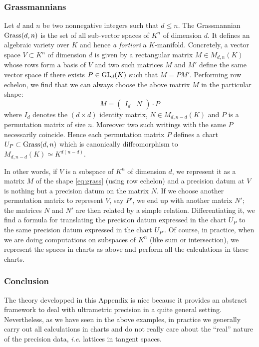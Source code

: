 \documentclass{lms}
\begin{document}
\subsubsection*{Grassmannians}

Let $d$ and $n$ be two nonnegative integers such that $d \leq n$. The 
Grassmannian $\text{\rm Grass}(d,n)$ is the set of all sub-vector spaces of $K^n$ 
of dimension $d$. It defines an algebraic variety over $K$ and hence
\emph{a fortiori} a $K$-manifold.
Concretely, a vector space $V \subset K^n$ of dimension $d$ is given by 
a rectangular matrix $M \in M_{d,n}(K)$ whose rows form a basis of $V$ 
and two such matrices $M$ and $M'$ define the same vector space if there 
exists $P \in \text{\rm GL}_d(K)$ such that $M = P M'$. Performing row echelon, we 
find that we can always choose the above matrix $M$ in the particular
shape:
\begin{equation}
\label{eq:grass}
M = \begin{pmatrix} I_d & N \end{pmatrix} \cdot P
\end{equation}
where $I_d$ denotes the $(d \times d)$ identity matrix, $N \in M_{d, 
n-d}(K)$ and $P$ is a permutation matrix of size $n$. Moreover two 
such writings with the same $P$ necessarily coincide. Hence each 
permutation matrix $P$ defines a chart $U_P \subset \text{\rm Grass}(d,n)$ which
is canonically diffeomorphism to $M_{d, n-d}(K) \simeq K^{d(n-d)}$.

In other words, if $V$ is a subspace of $K^n$ of dimension $d$, we 
represent it as a matrix $M$ of the shape \eqref{eq:grass} (using row 
echelon) and a precision datum at $V$ is nothing but a precision datum on 
the matrix $N$. If we choose another permutation matrix to represent $V$, 
say $P'$, we end up with another matrix $N'$; the matrices $N$ and $N'$ 
are then related by a simple relation. Differentiating it, we find a 
formula for translating the precision datum expressed in the chart $U_P$ 
to the same precision datum expressed in the chart $U_{P'}$.
Of course, in practice, when we are doing computations on subspaces of
$K^n$ (like sum or intersection), we represent the spaces in charts as
above and perform all the calculations in these charts.

\subsubsection*{Conclusion}

The theory developped in this Appendix is nice because it provides an 
abstract framework to deal with ultrametric precision in a quite general 
setting.
Nevertheless, as we have seen in the above examples, in practice we
generally carry out all calculations in charts and do not really care
about the ``real'' nature of the precision data, \emph{i.e.} lattices
in tangent spaces.
\end{document}
